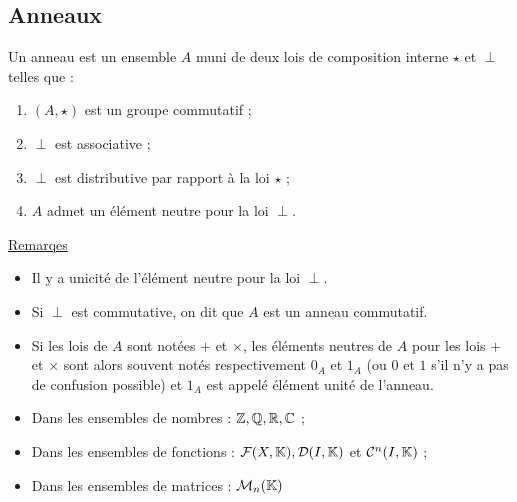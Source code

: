 \subsection{Anneaux}
\begin{defi}
    Un anneau est un ensemble \(A\) muni de deux lois de composition interne \(\star\) et \(\perp\) telles que :
    \begin{enumerate}
        \item \((A, \star)\) est un groupe commutatif ;
        \item \(\perp\) est associative ;
        \item \(\perp\) est distributive par rapport à la loi \(\star\) ;
        \item \(A\) admet un élément neutre pour la loi \(\perp\).
    \end{enumerate}
    \underline{Remarqes}\\
    \begin{itemize}
        \item Il y a unicité de l’élément neutre pour la loi \(\perp\).
        \item Si \(\perp\) est commutative, on dit que \(A\) est un anneau commutatif.
        \item Si les lois de \(A\) sont notées \(+ \) et \(\times\), les éléments neutres de \(A\) pour les lois \(+\) et \(\times\) sont alors souvent notés respectivement \(0_A\) et \(1_A\) (ou \(0\) et \(1\) s’il n’y a pas de confusion possible) et \(1_A\) est appelé élément unité de l’anneau.
    \end{itemize}
\end{defi}

\begin{defprop}
    \begin{itemize}
        \item Dans les ensembles de nombres : \(\mathbb{Z}, \mathbb{Q}, \mathbb{R}, \mathbb{C}\) ;
        \item Dans les ensembles de fonctions : \(\mathcal{F}(X, \mathbb{K}), \mathcal{D} (I, \mathbb{K})\) et \(\mathcal{C}^n (I, \mathbb{K})\) ;
        \item Dans les ensembles de matrices : \(\mathcal{M}_n (\mathbb{K})\)
    \end{itemize}
\end{defprop}

